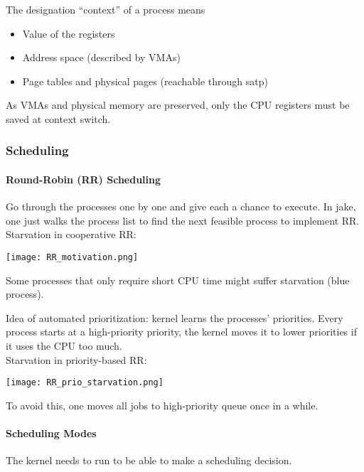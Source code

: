 \newpar{}

The designation ``context'' of a process means
\begin{itemize}
    \item Value of the registers
    \item Address space (described by VMAs)
    \item Page tables and physical pages (reachable through satp)
\end{itemize}
As VMAs and physical memory are preserved, only the CPU registers must be saved at context switch.

\subsubsection{Scheduling}
\paragraph{Round-Robin (RR) Scheduling}

Go through the processes one by one and give each a chance to execute. In jake, one just walks the process list to find the next feasible process to implement RR.\\
Starvation in cooperative RR:
\begin{center}
    \texttt{[image: RR\_motivation.png]}
\end{center}
Some processes that only require short CPU time might suffer starvation (blue process).

\newpar{}

Idea of automated prioritization: kernel learns the processes' priorities. Every process starts at a high-priority priority, the kernel moves it to lower priorities if it uses the CPU too much.\\
Starvation in priority-based RR:
\begin{center}
    \texttt{[image: RR\_prio\_starvation.png]}
\end{center}
To avoid this, one moves all jobs to high-priority queue once in a while.

\paragraph{Scheduling Modes}
The kernel needs to run to be able to make a scheduling decision.

\newpar{}

